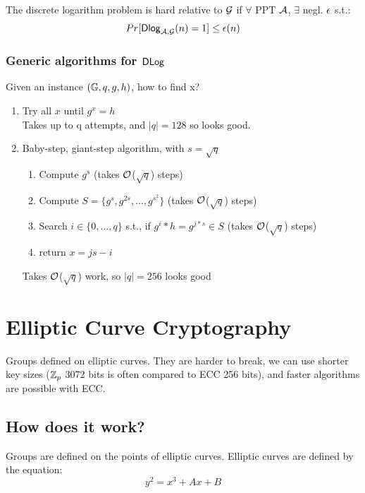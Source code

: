 \documentclass[12pt]{article}
\begin{document}
The discrete logarithm problem is hard relative to $\mathcal{G}$ if $\forall$ PPT $\mathcal{A}$, $\exists$ negl. $\epsilon$ s.t.:
\begin{equation*}
Pr[\mathsf{Dlog}_{\mathcal{A},\mathcal{G}}(n)=1] \le \epsilon(n)
\end{equation*}
\newpage
\subsubsection{Generic algorithms for $\mathsf{DLog}$}
Given an instance $(\mathbb{G},q,g,h)$, how to find x?
\begin{enumerate}
\item Try all $x$ until $g^x=h$\\
Takes up to q attempts, and $|q|=128$ so looks good.
\item Baby-step, giant-step algorithm, with $s=\sqrt{q}$
	\begin{enumerate}
	\item Compute $g^s$ (takes $\mathcal{O}$($\sqrt{q}$) steps) 
	\item Compute $S=\{g^s, g^{2s}, \dots, g^{s^2}\}$  (takes $\mathcal{O}$($\sqrt{q}$) steps) 
	\item Search $i \in \{0,\dots,q\}$ s.t., if $g^i*h = g^{j*s} \in S$ (takes $\mathcal{O}$($\sqrt{q}$) steps) 
	\item return $x=js-i$
	\end{enumerate}
	Takes  $\mathcal{O}$($\sqrt{q}$) work, so $|q|=256$ looks good

\end{enumerate}



\section{Elliptic Curve Cryptography}
Groups defined on elliptic curves. They are harder to break, we can use shorter key sizes ($\mathbb{Z}_p$ 3072 bits is often compared to ECC 256 bits), and faster algorithms are possible with ECC.
\newpage
\subsection{How does it work?}
Groups are defined on the points of elliptic curves. Elliptic curves are defined by the equation:
\begin{equation*}
y^2 = x^3+Ax+B
\end{equation*}
\end{document}
